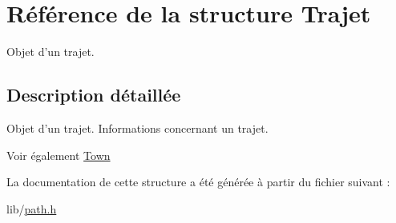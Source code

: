 \hypertarget{structTrajet}{
\section{Référence de la structure Trajet}
\label{structTrajet}
}


Objet d'un trajet.  




\subsection{Description détaillée}
Objet d'un trajet. Informations concernant un trajet.

\begin{DoxySeeAlso}{Voir également}
\hyperlink{structTown}{Town} 
\end{DoxySeeAlso}


La documentation de cette structure a été générée à partir du fichier suivant :\begin{DoxyCompactItemize}
\item 
lib/\hyperlink{path_8h}{path.h}\end{DoxyCompactItemize}
